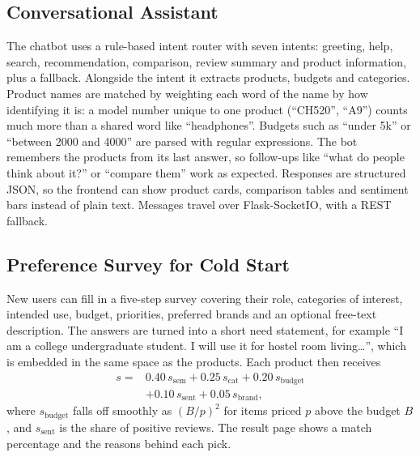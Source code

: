 \documentclass[conference]{IEEEtran}
\begin{document}
\subsection{Conversational Assistant}
The chatbot uses a rule-based intent router with seven intents: greeting, help, search, recommendation, comparison, review summary and product information, plus a fallback. Alongside the intent it extracts products, budgets and categories. Product names are matched by weighting each word of the name by how identifying it is: a model number unique to one product (``CH520'', ``A9'') counts much more than a shared word like ``headphones''. Budgets such as ``under 5k'' or ``between 2000 and 4000'' are parsed with regular expressions. The bot remembers the products from its last answer, so follow-ups like ``what do people think about it?'' or ``compare them'' work as expected. Responses are structured JSON, so the frontend can show product cards, comparison tables and sentiment bars instead of plain text. Messages travel over Flask-SocketIO, with a REST fallback.

\subsection{Preference Survey for Cold Start}
New users can fill in a five-step survey covering their role, categories of interest, intended use, budget, priorities, preferred brands and an optional free-text description. The answers are turned into a short need statement, for example ``I am a college undergraduate student. I will use it for hostel room living\ldots'', which is embedded in the same space as the products. Each product then receives
\begin{equation}
\begin{split}
s = {}& 0.40\,s_{\text{sem}} + 0.25\,s_{\text{cat}} + 0.20\,s_{\text{budget}}\\
& + 0.10\,s_{\text{sent}} + 0.05\,s_{\text{brand}},
\end{split}
\end{equation}
where $s_{\text{budget}}$ falls off smoothly as $(B/p)^2$ for items priced $p$ above the budget $B$, and $s_{\text{sent}}$ is the share of positive reviews. The result page shows a match percentage and the reasons behind each pick.

\end{document}
